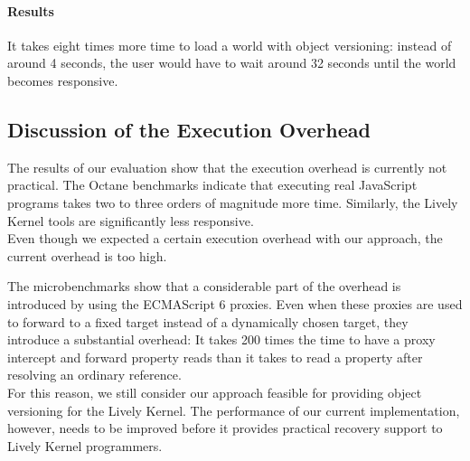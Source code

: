 \paragraph{Results}
It takes eight times more time to load a world with object versioning: instead of around 4 seconds, the user would have to wait around 32 seconds until the world becomes responsive.




\subsection{Discussion of the Execution Overhead}

The results of our evaluation show that the execution overhead is currently not practical.
The Octane benchmarks indicate that executing real JavaScript programs takes two to three orders of magnitude more time.
Similarly, the Lively Kernel tools are significantly less responsive.\\
Even though we expected a certain execution overhead with our approach, the current overhead is too high.

The microbenchmarks show that a considerable part of the overhead is introduced by using the ECMAScript 6 proxies.
Even when these proxies are used to forward to a fixed target instead of a dynamically chosen target, they introduce a substantial overhead:
It takes 200 times the time to have a proxy intercept and forward property reads than it takes to read a property after resolving an ordinary reference.\\
For this reason, we still consider our approach feasible for providing object versioning for the Lively Kernel.
The performance of our current implementation, however, needs to be improved before it provides practical recovery support to Lively Kernel programmers.
